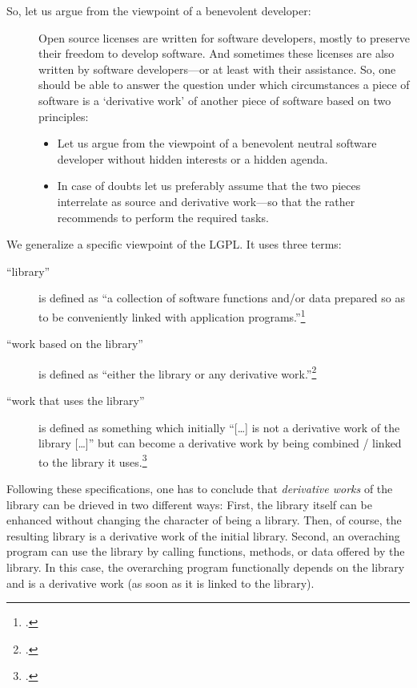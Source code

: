 {\begin{description}
  \item[So, let us argue from the viewpoint of a benevolent developer:]\softbreak
    Open source licenses are written for software developers, mostly to preserve
    their freedom to develop software. And sometimes these licenses are also
    written by software developers---or at least with their assistance. So, one
    should be able to answer the question under which circumstances a piece of
    software is a `derivative work' of another piece of software based on two
    principles: 
  \begin{itemize}
    \item Let us argue from the viewpoint of a benevolent neutral software
      developer without hidden interests or a hidden agenda.
    \item In case of doubts let us preferably assume that the two pieces
      interrelate as source and derivative work---so that the \oslic{} rather
      recommends to perform the required tasks.
  \end{itemize}
\end{description}

We generalize a specific viewpoint of the LGPL. It uses three terms:

\begin{description}
  \item[\enquote{library}] is defined as \enquote{a collection of software
  functions and/or data prepared so as to be conveniently linked with
  application programs.}\footcite[cf.][\nopage wp §0]{Lgpl21OsiLicense1999a}
  \item[\enquote{work based on the library}] is defined as \enquote{either the
  library or any derivative work.}\footcite[cf.][\nopage wp
  §0]{Lgpl21OsiLicense1999a}
  \item[\enquote{work that uses the library}] is defined as something which
  initially \enquote{[\ldots] is not a derivative work of the library [\ldots]}
  but can become a derivative work by being combined / linked to the library it
  uses.\footcite[cf.][\nopage wp §5]{Lgpl21OsiLicense1999a}
\end{description}

Following these specifications, one has to conclude that 
\emph{derivative works} of the library can be drieved in two different ways: 
First, the library itself can be enhanced without changing the character of 
being a library. Then, of course, the resulting library is a derivative work 
of the initial library.  Second, an overaching program can use the library by 
calling functions, methods, or data offered by the library. In this case, the 
overarching program functionally depends on the library and is a derivative work 
(as soon as it is linked to the library).

}

